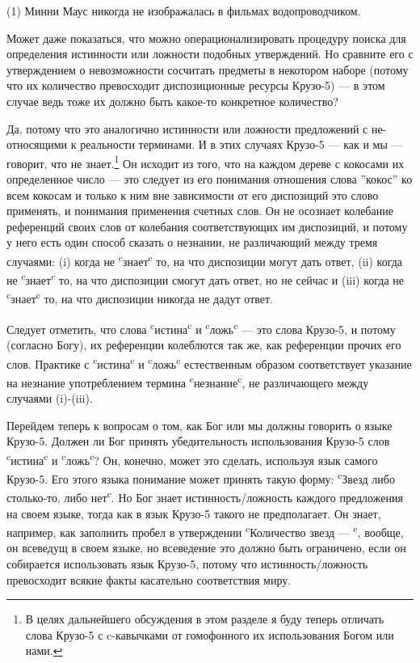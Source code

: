 \documentclass[11pt]{book}
\begin{document}
\smallskip

(1) Минни Маус никогда не изображалась в фильмах водопроводчиком.

\smallskip

Может даже показаться, что можно операционализировать процедуру поиска для определения истинности или ложности подобных утверждений. Но сравните его с утверждением о невозможности сосчитать предметы в некотором наборе (потому что их количество превосходит диспозиционные ресурсы Крузо-5) --- в этом случае ведь тоже их должно быть какое-то конкретное количество?

Да, потому что это аналогично истинности или ложности предложений с не-относящими к реальности терминами. И в этих случаях Крузо-5 --- как и мы --- говорит, что не знает.\footnote{В целях дальнейшего обсуждения в этом разделе я буду теперь отличать слова Крузо-5 с c-кавычками от гомофонного их использования Богом или нами.} Он исходит из того, что на каждом дереве с кокосами их определенное число --- это следует из его понимания отношения слова ''кокос'' ко всем кокосам и только к ним вне зависимости от его диспозиций это слово применять, и понимания применения счетных слов. Он не осознает колебание референций своих слов от колебания соответствующих им диспозиций, и потому у него есть один способ сказать о незнании, не различающий между тремя случаями: (i) когда не \textsuperscript{c}знает\textsuperscript{c} то, на что диспозиции могут дать ответ, (ii) когда не \textsuperscript{c}знает\textsuperscript{c} то, на что диспозиции смогут дать ответ, но не сейчас и (iii) когда не \textsuperscript{c}знает\textsuperscript{c} то, на что диспозиции никогда не дадут ответ.

Следует отметить, что слова \textsuperscript{c}истина\textsuperscript{c} и \textsuperscript{c}ложь\textsuperscript{c} --- это слова Крузо-5, и потому (согласно Богу), их референции колеблются так же, как референции прочих его слов. Практике с \textsuperscript{c}истина\textsuperscript{c} и \textsuperscript{c}ложь\textsuperscript{c} естественным образом соответствует указание на незнание употреблением термина \textsuperscript{c}незнание\textsuperscript{c}, не различающего между случаями (i)-(iii).

Перейдем теперь к вопросам о том, как Бог или мы должны говорить о языке Крузо-5. Должен ли Бог принять убедительность использования Крузо-5 слов \textsuperscript{c}истина\textsuperscript{c} и \textsuperscript{c}ложь\textsuperscript{c}? Он, конечно, может это сделать, используя язык самого Крузо-5. Его этого языка понимание может принять такую форму: \textsuperscript{c}Звезд либо столько-то, либо нет\textsuperscript{c}. Но Бог знает истинность/ложность каждого предложения на своем языке, тогда как в язык Крузо-5 такого не предполагает. Он знает, например, как заполнить пробел в утверждении \textsuperscript{c}Количество звезд --- \textsuperscript{c}, вообще, он всеведущ в своем языке, но всеведение это должно быть ограничено, если он собирается использовать язык Крузо-5, потому что истинность/ложность превосходит всякие факты касательно соответствия миру.
\end{document}
